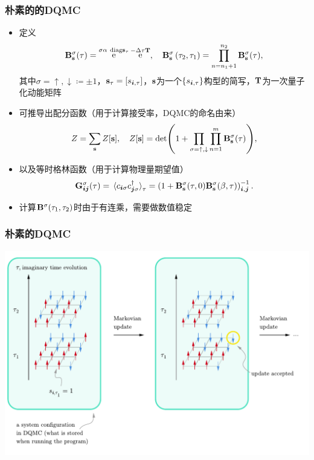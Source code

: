 \documentclass[UTF8]{ctexbeamer}
\DeclareMathOperator{\ee}{e}
\begin{document}
\begin{frame}
\frametitle{朴素的的DQMC}

\begin{itemize}
    \item 定义
    \begin{equation}
        \vb{B}^{\sigma}_{\vb{s}}(\tau) = \ee^{\sigma \alpha \ \mathrm{diag}{\vb{s}_\tau}} \ee^{- \Delta \tau \vb{T}}, \quad \mathbf{B}^\sigma_{\mathbf{s}}\left(\tau_{2}, \tau_{1}\right)=\prod_{n=n_{1}+1}^{n_{2}} \vb{B}^{\sigma}_{\vb{s}}(\tau), 
    \end{equation}
    其中$\sigma = \uparrow, \downarrow \coloneqq \pm 1$，$\vb{s}_{\tau} = [s_{\vb*{i}, \tau}]$，$\vb{s}$为一个$\{s_{\vb*{i}, \tau}\}$构型的简写，$\vb{T}$为一次量子化动能矩阵
    \item 可推导出配分函数（用于计算接受率，DQMC的命名由来）
    \begin{equation}
        Z = \sum_{\vb{s}} Z[\vb{s}], \quad Z[\vb{s}] = \det(1 + \prod_{\sigma=\uparrow, \downarrow} \prod_{n=1}^m \vb{B}_{\vb{s}}^\sigma(\tau) ),
    \end{equation}
    \item 以及等时格林函数（用于计算物理量期望值）
    \begin{equation}
        \vb{G}^\sigma_{\vb*{i} \vb*{j}}(\tau) = \expval*{c_{\vb*{i} \sigma} c^\dagger_{\vb*{j} \sigma}}_\tau = \left(1+\mathbf{B}^\sigma_{\mathbf{s}}(\tau, 0) \mathbf{B}^\sigma_{\mathbf{s}}(\beta, \tau)\right)^{-1}_{\vb*{i}, \vb*{j}}.
    \end{equation}
    \item 计算$\vb{B}^\sigma(\tau_1, \tau_2)$时由于有连乘，需要做数值稳定
\end{itemize}

\end{frame}

\begin{frame}
\frametitle{朴素的DQMC}

\begin{center}
    \includegraphics[width=\textwidth]{naive-dqmc.pdf}
\end{center}

\end{frame}
\end{document}
